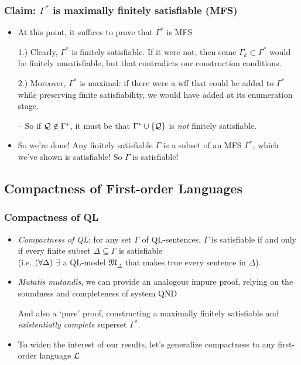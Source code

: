 \begin{frame}
\frametitle{Claim: $\Gamma^{\ast}$ is maximally finitely satisfiable (MFS)}

\begin{itemize}[<+->]

\item At this point, it suffices to prove that $\Gamma^{\ast}$ is MFS

\item[1.)] Clearly, $\Gamma^{\ast}$ is finitely satisfiable. If it were not, then some $\Gamma_k \subset \Gamma^{\ast}$ would be finitely unsatisfiable, but that contradicts our construction conditions. 

\item[2.)] Moreover, $\Gamma^{\ast}$ is maximal: if there were a wff  that could be added to $\Gamma^{\ast}$ while preserving finite satisfiability, we would have added  at its enumeration stage. 

\item[] -- So if $\mathcal{Q} \notin \Gamma^{\ast}$, it must be that $\Gamma^{\ast} \cup \{\mathcal{Q} \}$ is \textit{not} finitely satisfiable. 

\item So we're done! Any finitely satisfiable $\Gamma$ is a subset of an MFS $\Gamma^{\ast}$, which we've shown is satisfiable! So $\Gamma$ is satisfiable!

\end{itemize}
\end{frame}



\subsection{Compactness of First-order Languages}

\begin{frame}
\frametitle{Compactness of QL}

\begin{itemize}[<+->]

\item \emph{Compactness of QL}: for any set $\Gamma$ of QL-sentences, $\Gamma$ is satisfiable if and only if every finite subset $\Delta \subseteq \Gamma$ is satisfiable \\ (i.e. $(\forall \Delta)$ $\exists$ a QL-model $\mathfrak{M}_{\Delta}$ that makes true every sentence in $\Delta$). 

\item \textit{Mutatis mutandis}, we can provide an analogous impure  proof, relying on the soundness and completeness of system QND

\item[] And also a `pure' proof, constructing a maximally finitely satisfiable and \textit{existentially complete} superset $\Gamma^{\ast}$. 

\item To widen the interest of our results, let's generalize compactness to any first-order language $\mathcal{L}$

\end{itemize}
\end{frame}

